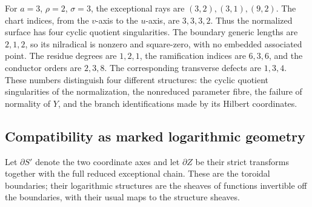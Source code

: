\begin{example}
\label{ex:third-ramified-v170}
For $a=3$, $\rho=2$, $\sigma=3$, the exceptional rays are
$(3,2),(3,1),(9,2)$. The chart indices, from the $v$-axis to the
$u$-axis, are $3,3,3,2$. Thus the normalized surface has four cyclic
quotient singularities. The boundary generic lengths are $2,1,2$,
so its nilradical is nonzero and square-zero, with no embedded
associated point. The residue degrees are $1,2,1$, the ramification
indices are $6,3,6$, and the conductor orders are $2,3,8$.
The corresponding transverse defects are $1,3,4$.
These numbers distinguish four different structures: the cyclic
quotient singularities of the normalization, the nonreduced
parameter fibre, the failure of normality of $Y$, and the branch
identifications made by its Hilbert coordinates.
\end{example}

\subsection{Compatibility as marked logarithmic geometry}
Let $\partial S'$ denote the two coordinate axes and let
$\partial Z$ be their strict transforms together with the full
reduced exceptional chain. These are the toroidal boundaries; their
logarithmic structures are the sheaves of functions invertible off
the boundaries, with their usual maps to the structure sheaves.

